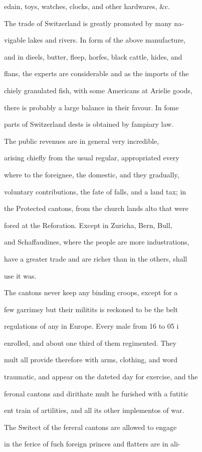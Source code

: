 \documentclass{article}
\begin{document}
edain, toys, watches, clocks, and other hardwares, \&c.

The trade of Switzerland is greatly promoted by many na-

vigable lakes and rivers. In form of the above manufacture,

and in dieels, butter, fleep, horfes, black cattle, hides, and

flans, the experts are considerable and as the imports of the

chiely granulated fish, with some Americans at Arielie goods,

there is probably a large balance in their favour. In fome

parts of Switzerland dests is obtained by fampiary law.

The public revenues are in general very incredible,

arising chiefly from the usual regular, appropriated every

where to the foreignee, the domestic, and they gradually,

voluntary contributions, the fate of falls, and a land tax; in

the Protected cantons, from the church lands alto that were

fored at the Reforation. Except in Zuricha, Bern, Bull,

and Schaffaudines, where the people are more industrations,

have a greater trade and are richer than in the others, shall

use it was.

The cantons never keep any binding croops, except for a

few garrimsy but their militits is reckoned to be the belt

regulations of any in Europe. Every male from 16 to 05 i

enrolled, and about one third of them regimented. They

mult all provide therefore with arms, clothing, and word

traumatic, and appear on the dateted day for exercise, and the

feronal cantons and dirithate mult he furished with a futitic

ent train of artilities, and all its other implementos of war.

The Switect of the fereral cantons are allowed to engage

in the ferice of fuch foreign princes and flatters are in ali-
\end{document}
